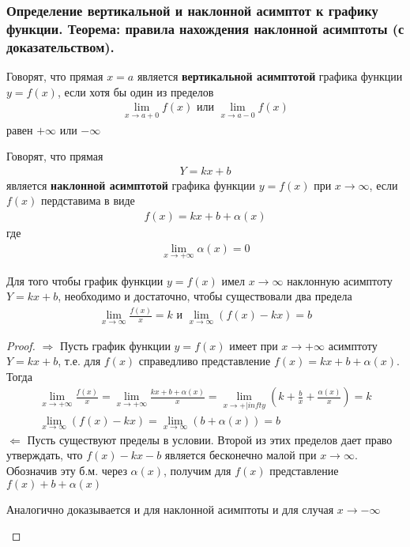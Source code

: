 \documentclass[10pt]{article}
\begin{document}
    \subsubsection{Определение вертикальной и наклонной асимптот к графику функции. Теорема: правила нахождения наклонной асимптоты (с доказательством).}
    \begin{definition}
        Говорят, что прямая $x = a$ является \textbf{вертикальной асимптотой} графика функции $y = f(x)$, если хотя бы один из пределов
        \begin{gather*}
            \lim_{x \to a+0}f(x) \text{ или } \lim_{x \to a-0}f(x)
        \end{gather*}
        равен $+\infty$ или $-\infty$
    \end{definition}
    \begin{definition}
        Говорят, что прямая
        \begin{gather*}
            Y=kx+b
        \end{gather*}
        является \textbf{наклонной асимптотой} графика функции $y = f(x)$ при $x \to \infty$, если $f(x)$ пердставима в виде
        \begin{gather*}
            f(x) = kx+b+\alpha(x)
        \end{gather*}
        где
        \begin{gather*}
            \lim_{x \to +\infty} \alpha(x) = 0
        \end{gather*}
    \end{definition}
    \begin{theorem}
        Для того чтобы график функции $y = f(x)$ имел $x \to \infty$ наклонную асимптоту $Y=kx+b$, необходимо и достаточно, чтобы существовали два предела
        \begin{gather*}
            \lim_{x \to \infty} \frac{f(x)}{x} = k \text{ и } \lim_{x \to \infty} (f(x) - kx) = b
        \end{gather*}
    \end{theorem}
    \begin{proof}
        $\Rightarrow$
        Пусть график функции $y = f(x)$ имеет при $x \to +\infty$ асимптоту $Y=kx+b$, т.е. для $f(x)$ справедливо представление $f(x) = kx+b+\alpha(x)$. Тогда
        \begin{gather*}
        \lim_{x \to +\infty} \frac{f(x)}{x} = \lim_{x \to +\infty} \frac{kx + b + \alpha(x)}{x} = \lim_{x \to +|infty}(k + \frac{b}{x} + \frac{\alpha(x)}{x}) = k \\
        \lim_{x \to \infty}(f(x) - kx) = \lim_{x \to \infty}(b+\alpha(x)) = b
        \end{gather*}
        $\Leftarrow$
        Пусть существуют пределы в условии. Второй из этих пределов дает право утверждать, что $f(x) - kx - b$ является бесконечно малой при $x \to \infty$. Обозначив эту б.м. через $\alpha(x)$, получим для $f(x)$ представление $f(x) + b + \alpha(x)$
        \begin{remark}
            Аналогично доказывается и для наклонной асимптоты и для случая $x \to -\infty$
        \end{remark}
    \end{proof}
\end{document}

